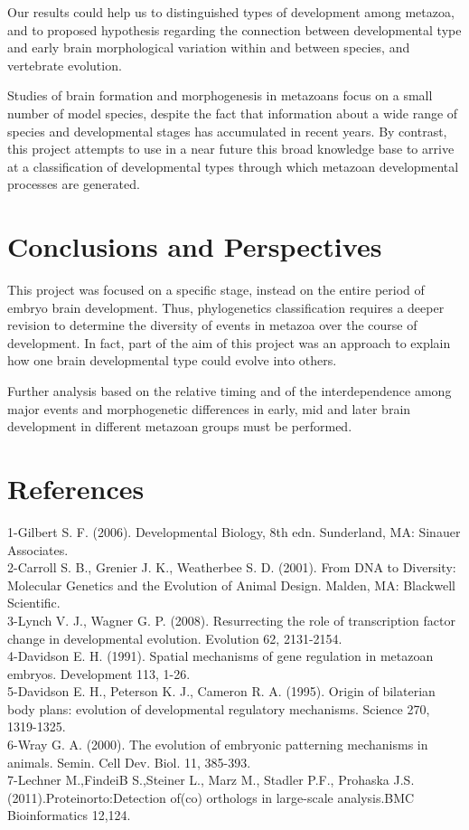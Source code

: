 \documentclass[a4paper]{article}
\begin{document}
Our results could help us to distinguished types of development among metazoa, and to proposed hypothesis regarding the connection between developmental type and early brain morphological variation within and between species, and vertebrate evolution.
 
Studies of brain formation and morphogenesis in metazoans focus on a small number of model species, despite the fact that information about a wide range of species and developmental stages has accumulated in recent years. By contrast, this project attempts to use in a near future this broad knowledge base to arrive at a classification of developmental types through which metazoan developmental processes are generated. 


\section*{Conclusions and Perspectives}
This project was focused on a specific stage, instead on the entire period of embryo brain development.
Thus, phylogenetics classification requires a deeper revision to determine the diversity of events in metazoa over the course of development. In fact, part of the aim of this project was an approach to explain how one brain developmental type could evolve into others.

Further analysis based on the relative timing and of the interdependence among major events and morphogenetic differences in early, mid and later  brain development in different metazoan groups must be performed.



\section*{References}
1-Gilbert S. F. (2006). Developmental Biology, 8th edn. Sunderland, MA: Sinauer Associates.\\
2-Carroll S. B., Grenier J. K., Weatherbee S. D. (2001). From DNA to Diversity: Molecular Genetics and the Evolution of Animal Design. Malden, MA: Blackwell Scientific.\\
3-Lynch V. J., Wagner G. P. (2008). Resurrecting the role of transcription factor change in developmental evolution. Evolution 62, 2131-2154.\\
4-Davidson E. H. (1991). Spatial mechanisms of gene regulation in metazoan embryos. Development 113, 1-26.\\
5-Davidson E. H., Peterson K. J., Cameron R. A. (1995). Origin of bilaterian body plans: evolution of developmental regulatory mechanisms. Science 270, 1319-1325. \\
6-Wray G. A. (2000). The evolution of embryonic patterning mechanisms in animals. Semin. Cell Dev. Biol. 11, 385-393.\\
7-Lechner M.,FindeiB S.,Steiner L., Marz M., Stadler P.F., Prohaska J.S. (2011).Proteinorto:Detection of(co) orthologs in large-scale analysis.BMC Bioinformatics 12,124.
\end{document}
